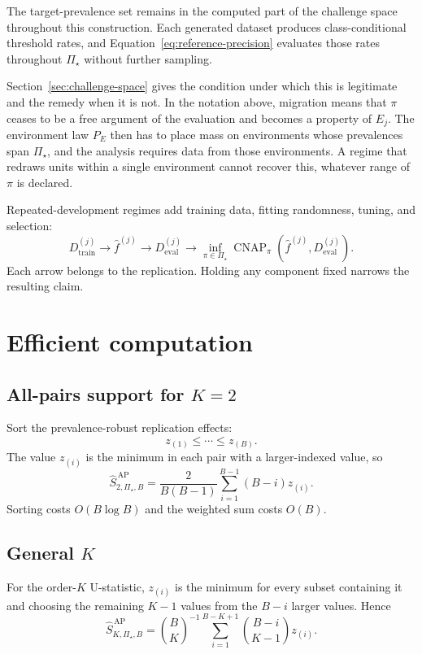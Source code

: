 \documentclass[11pt]{article}
\newcommand{\CNAP}{\operatorname{CNAP}}
\newcommand{\PSet}{\Pi_\star}
\theoremstyle{remark}
\begin{document}
The target-prevalence set remains in the computed part of the challenge space throughout this construction. Each generated dataset produces class-conditional threshold rates, and Equation~\eqref{eq:reference-precision} evaluates those rates throughout $\PSet$ without further sampling.

Section~\ref{sec:challenge-space} gives the condition under which this is legitimate and the remedy when it is not. In the notation above, migration means that $\pi$ ceases to be a free argument of the evaluation and becomes a property of $E_j$. The environment law $P_E$ then has to place mass on environments whose prevalences span $\PSet$, and the analysis requires data from those environments. A regime that redraws units within a single environment cannot recover this, whatever range of $\pi$ is declared.

Repeated-development regimes add training data, fitting randomness, tuning, and selection:
\[
D_{\mathrm{train}}^{(j)}
\longrightarrow
\widehat f^{(j)}
\longrightarrow
D_{\mathrm{eval}}^{(j)}
\longrightarrow
\inf_{\pi\in\PSet}
\CNAP_\pi(\widehat f^{(j)},D_{\mathrm{eval}}^{(j)}).
\]
Each arrow belongs to the replication. Holding any component fixed narrows the resulting claim.

\section{Efficient computation}
\label{app:computation}

\subsection{All-pairs support for $K=2$}

Sort the prevalence-robust replication effects:
\[
z_{(1)}\leq\cdots\leq z_{(B)}.
\]
The value $z_{(i)}$ is the minimum in each pair with a larger-indexed value, so
\begin{equation}
\widehat S_{2,\PSet,B}^{\,\mathrm{AP}}
=
\frac{2}{B(B-1)}
\sum_{i=1}^{B-1}
(B-i)z_{(i)}.
\label{eq:sorted-pairs}
\end{equation}
Sorting costs $O(B\log B)$ and the weighted sum costs $O(B)$.

\subsection{General $K$}

For the order-$K$ U-statistic, $z_{(i)}$ is the minimum for every subset containing it and choosing the remaining $K-1$ values from the $B-i$ larger values. Hence
\begin{equation}
\widehat S_{K,\PSet,B}^{\,\mathrm{AP}}
=
\binom{B}{K}^{-1}
\sum_{i=1}^{B-K+1}
\binom{B-i}{K-1}
z_{(i)}.
\label{eq:sorted-general-k}
\end{equation}
\end{document}
